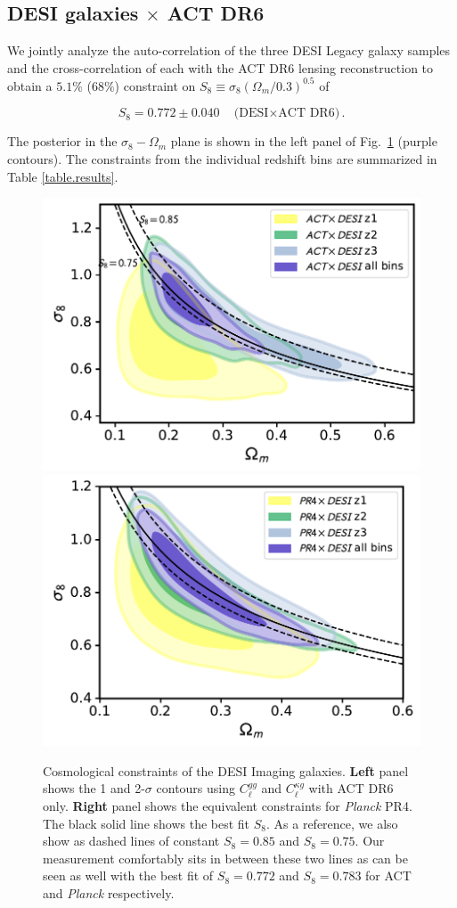 \documentclass[twocolumn]{aastex631}
\begin{document}
{\subsection{DESI galaxies $\times$ ACT DR6} \label{result_ACT}

We jointly analyze the  auto-correlation of the three DESI Legacy galaxy samples and the cross-correlation of each with the ACT DR6 lensing reconstruction to obtain a $5.1\%$ ($68\%$) constraint on $S_8\equiv\sigma_8(\Omega_m/0.3)^{0.5}$ of

\begin{equation}
    S_8=0.772\pm0.040 \quad \text{(DESI$\times$ACT DR6)}.
\end{equation}

    
 The posterior in the $\sigma_8-\Omega_m$ plane is shown in the left panel of Fig.~\ref{fig: banana plot - act pr4 split zbin} (purple contours). The constraints from the individual redshift bins are summarized in Table \ref{table.results}.



\begin{figure}
    \centering
    \includegraphics[width=0.5\linewidth]{figures/act_contours_bf.pdf}%
    \includegraphics[width=0.5\linewidth]{figures/planck_contours_bf.pdf}
    
    \caption{Cosmological constraints of the DESI Imaging galaxies. \textbf{Left} panel shows the 1 and 2-$\sigma$ contours using $C^{gg}_\ell$ and $C^{\kappa{g}}_\ell$ with ACT DR6 only. \textbf{Right} panel shows the equivalent constraints for \textit{Planck} PR4. The black solid line shows the best fit $S_8$.
    As a reference, we also show as dashed lines of constant $S_8=0.85$ and $S_8=0.75$. Our measurement comfortably sits in between these two lines as can be seen as well with the best fit of $S_8=0.772$ and $S_8=0.783$ for ACT and \textit{Planck} respectively. }
    \label{fig: banana plot - act pr4 split zbin}
\end{figure}


}
\end{document}
